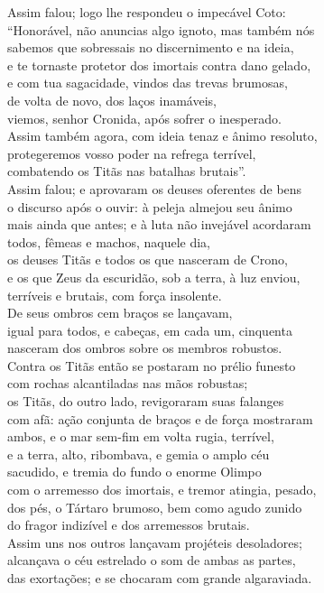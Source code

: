 \quad{}Assim falou; logo lhe respondeu o impecável Coto:\\
``Honorável, não anuncias algo ignoto, mas também nós \\
sabemos que sobressais no discernimento e na ideia,\\
e te tornaste protetor dos imortais contra dano gelado,\\
e com tua sagacidade, vindos das trevas brumosas,\\
de volta de novo, dos laços inamáveis,\\
viemos, senhor Cronida, após sofrer o inesperado. \\
Assim também agora, com ideia tenaz e ânimo resoluto,\\
protegeremos vosso poder na refrega terrível,\\
combatendo os Titãs nas batalhas brutais''.\\
Assim falou; e aprovaram os deuses oferentes de bens\\
o discurso após o ouvir: à peleja almejou seu ânimo \\
mais ainda que antes; e à luta não invejável acordaram\\
todos, fêmeas e machos, naquele dia,\\
os deuses Titãs e todos os que nasceram de Crono,\\
e os que Zeus da escuridão, sob a terra, à luz enviou,\\
terríveis e brutais, com força insolente. \\
De seus ombros cem braços se lançavam,\\
igual para todos, e cabeças, em cada um, cinquenta\\
nasceram dos ombros sobre os membros robustos.\\
Contra os Titãs então se postaram no prélio funesto\\
com rochas alcantiladas nas mãos robustas; \\
os Titãs, do outro lado, revigoraram suas falanges\\
com afã: ação conjunta de braços e de força mostraram\\
ambos, e o mar sem-fim em volta rugia, terrível,\\
e a terra, alto, ribombava, e gemia o amplo céu\\
sacudido, e tremia do fundo o enorme Olimpo \\
com o arremesso dos imortais, e tremor atingia, pesado,\\
dos pés, o Tártaro brumoso, bem como agudo zunido\\
do fragor indizível e dos arremessos brutais.\\
Assim uns nos outros lançavam projéteis desoladores;\\
alcançava o céu estrelado o som de ambas as partes, \\
das exortações; e se chocaram com grande algaraviada.

